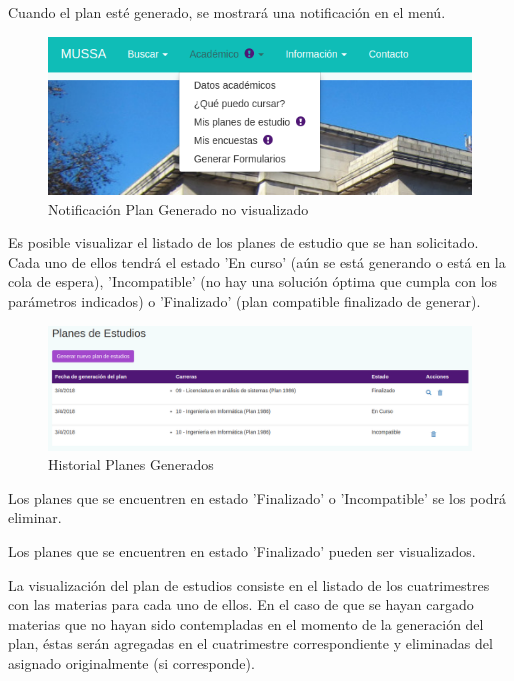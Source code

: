 \documentclass[a4paper]{article}
\begin{document}
Cuando el plan esté generado, se mostrará una notificación en el menú.

\begin{figure}[H]
\centering
\includegraphics[scale=0.35]{Imagenes/notificacion_plan_generado.png}\par
\caption{Notificación Plan Generado no visualizado}
\end{figure}

Es posible visualizar el listado de los planes de estudio que se han solicitado. Cada uno de ellos tendrá el estado 'En curso' (aún se está generando o está en la cola de espera), 'Incompatible' (no hay una solución óptima que cumpla con los parámetros indicados) o 'Finalizado' (plan compatible finalizado de generar).

\begin{figure}[H]
\centering
\includegraphics[scale=0.3]{Imagenes/historial_planes_generados.png}\par
\caption{Historial Planes Generados}
\end{figure}

Los planes que se encuentren en estado 'Finalizado' o 'Incompatible' se los podrá eliminar.

Los planes que se encuentren en estado 'Finalizado' pueden ser visualizados.

La visualización del plan de estudios consiste en el listado de los cuatrimestres con las materias para cada uno de ellos. En el caso de que se hayan cargado materias que no hayan sido contempladas en el momento de la generación del plan, éstas serán agregadas en el cuatrimestre correspondiente y eliminadas del asignado originalmente (si corresponde).
\end{document}
